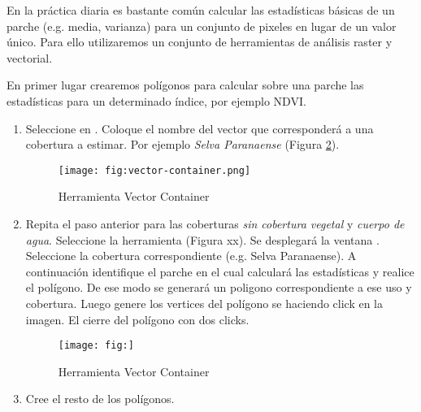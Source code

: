 En la práctica diaria es bastante común calcular las estadísticas básicas de un parche (e.g. media, varianza) para un conjunto de pixeles en lugar de un valor único. Para ello utilizaremos un conjunto de herramientas de análisis raster y vectorial.%

En primer lugar crearemos polígonos para calcular sobre una parche las estadísticas para un determinado índice, por ejemplo NDVI.

\begin{enumerate}
\item Seleccione en . Coloque el nombre del vector que corresponderá a una cobertura a estimar. Por ejemplo \emph{Selva Paranaense} (Figura \ref{fig:vector-container}).

\begin{figure}[h!]
    \centering
    \texttt{[image: fig:vector-container.png]}
    \caption{Herramienta Vector Container}
    \label{fig:vector-container}
\end{figure}


\item Repita el paso anterior para las coberturas \emph{sin cobertura vegetal} y \emph {cuerpo de agua}. Seleccione la herramienta  (Figura xx). Se desplegará la ventana . Seleccione la cobertura correspondiente (e.g. Selva Paranaense). A continuación identifique el parche en el cual calculará las estadísticas y realice el polígono. De ese modo se generará un poligono correspondiente a ese uso y cobertura. Luego genere los vertices del polígono se haciendo click en la imagen. El cierre del polígono con dos clicks.

\begin{figure}[h!]
    \centering
    \texttt{[image: fig:]}
    \caption{Herramienta Vector Container}
    \label{fig:vector-container}
\end{figure}

\item Cree el resto de los polígonos.
\end{enumerate}

%






